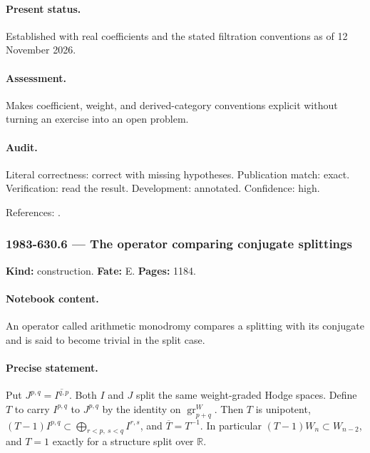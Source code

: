 \paragraph{Present status.} Established with real coefficients and the stated filtration conventions as of 12 November 2026.

\paragraph{Assessment.} Makes coefficient, weight, and derived-category conventions explicit without turning an exercise into an open problem.

\paragraph{Audit.} Literal correctness: correct with missing hypotheses. Publication match: exact. Verification: read the result. Development: annotated. Confidence: high.

\noindent References: \citep{deligne1971hodge,deligne1974hodge}.\par

\subsubsection{1983-630.6 --- The operator comparing conjugate splittings}

\label{item:1983-630.6}

\noindent\textbf{Kind:} construction. \textbf{Fate:} E. \textbf{Pages:} 1184.\par

\paragraph{Notebook content.} An operator called arithmetic monodromy compares a splitting with its conjugate and is said to become trivial in the split case.

\paragraph{Precise statement.} Put \(J^{p,q}=\overline{I^{q,p}}\). Both \(I\) and \(J\) split the same weight-graded Hodge spaces. Define \(T\) to carry \(I^{p,q}\) to \(J^{p,q}\) by the identity on \(\operatorname{gr}^W_{p+q}\). Then \(T\) is unipotent, \((T-1)I^{p,q}\subset\bigoplus_{r<p,\ s<q}I^{r,s}\), and \(\overline T=T^{-1}\). In particular \((T-1)W_n\subset W_{n-2}\), and \(T=1\) exactly for a structure split over \(\mathbb R\).

